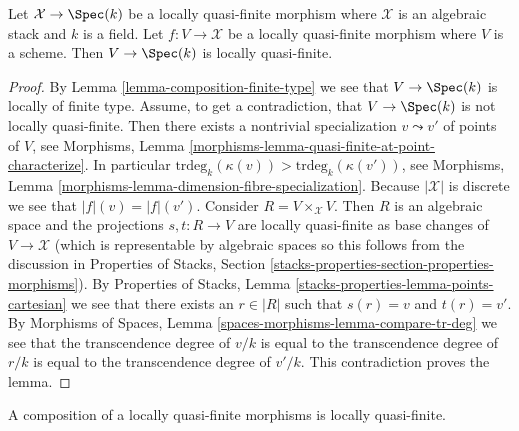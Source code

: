 \begin{lemma}
\label{lemma-locally-quasi-finite-over-field}
Let $\mathcal{X} \to \Spec(k)$ be a locally quasi-finite morphism
where $\mathcal{X}$ is an algebraic stack and $k$ is a field.
Let $f : V \to \mathcal{X}$ be a locally quasi-finite morphism where
$V$ is a scheme. Then $V \to \Spec(k)$ is locally quasi-finite.
\end{lemma}

\begin{proof}
By
Lemma \ref{lemma-composition-finite-type}
we see that $V \to \Spec(k)$ is locally of finite type.
Assume, to get a contradiction, that $V \to \Spec(k)$ is not
locally quasi-finite. Then there exists a nontrivial specialization
$v \leadsto v'$ of points of $V$, see
Morphisms, Lemma \ref{morphisms-lemma-quasi-finite-at-point-characterize}.
In particular $\text{trdeg}_k(\kappa(v)) > \text{trdeg}_k(\kappa(v'))$, see
Morphisms, Lemma \ref{morphisms-lemma-dimension-fibre-specialization}.
Because $|\mathcal{X}|$ is discrete we see that $|f|(v) = |f|(v')$.
Consider $R = V \times_\mathcal{X} V$. Then $R$ is an algebraic space
and the projections $s, t : R \to V$ are locally quasi-finite as base
changes of $V \to \mathcal{X}$ (which is representable by algebraic spaces
so this follows from the discussion in
Properties of Stacks, Section
\ref{stacks-properties-section-properties-morphisms}).
By
Properties of Stacks, Lemma \ref{stacks-properties-lemma-points-cartesian}
we see that there exists an $r \in |R|$ such that $s(r) = v$ and $t(r) = v'$.
By
Morphisms of Spaces, Lemma \ref{spaces-morphisms-lemma-compare-tr-deg}
we see that the transcendence degree of $v/k$ is equal to the
transcendence degree of $r/k$ is equal to the transcendence degree of
$v'/k$. This contradiction proves the lemma.
\end{proof}

\begin{lemma}
\label{lemma-composition-locally-quasi-finite}
A composition of a locally quasi-finite morphisms is locally quasi-finite.
\end{lemma}

